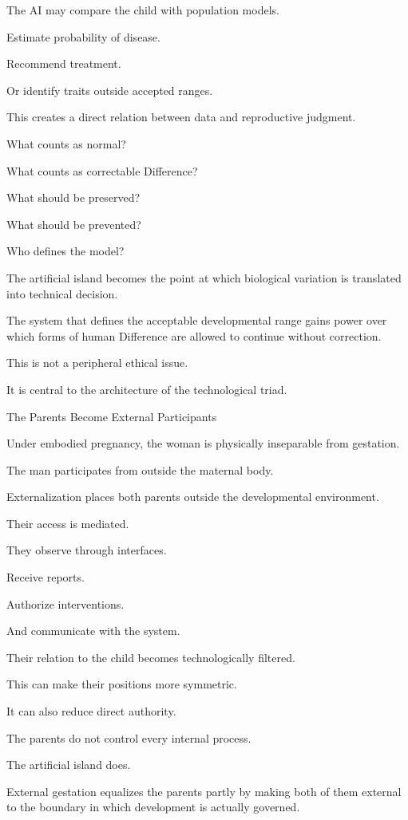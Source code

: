 The AI may compare the child with population models.

Estimate probability of disease.

Recommend treatment.

Or identify traits outside accepted ranges.

This creates a direct relation between data and reproductive judgment.

What counts as normal?

What counts as correctable Difference?

What should be preserved?

What should be prevented?

Who defines the model?

The artificial island becomes the point at which biological variation is translated into technical decision.

The system that defines the acceptable developmental range gains power over which forms of human Difference are allowed to continue without correction.

This is not a peripheral ethical issue.

It is central to the architecture of the technological triad.

The Parents Become External Participants

Under embodied pregnancy, the woman is physically inseparable from gestation.

The man participates from outside the maternal body.

Externalization places both parents outside the developmental environment.

Their access is mediated.

They observe through interfaces.

Receive reports.

Authorize interventions.

And communicate with the system.

Their relation to the child becomes technologically filtered.

This can make their positions more symmetric.

It can also reduce direct authority.

The parents do not control every internal process.

The artificial island does.

External gestation equalizes the parents partly by making both of them external to the boundary in which development is actually governed.

